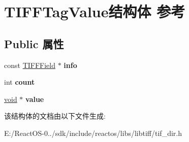\hypertarget{struct_t_i_f_f_tag_value}{}\section{T\+I\+F\+F\+Tag\+Value结构体 参考}
\label{struct_t_i_f_f_tag_value}
\subsection*{Public 属性}
\begin{DoxyCompactItemize}
\item 
\mbox{\label{struct_t_i_f_f_tag_value_a395eac2333247f02552761c84d50030d}} 
const \hyperlink{struct___t_i_f_f_field}{T\+I\+F\+F\+Field} $\ast$ {\bfseries info}
\item 
\mbox{\label{struct_t_i_f_f_tag_value_a309d152f68ea67d12ed0fd6a9667b799}} 
int {\bfseries count}
\item 
\mbox{\label{struct_t_i_f_f_tag_value_a04d8c5b64d026de38175c68c7b5ff02f}} 
\hyperlink{interfacevoid}{void} $\ast$ {\bfseries value}
\end{DoxyCompactItemize}


该结构体的文档由以下文件生成\+:\begin{DoxyCompactItemize}
\item 
E\+:/\+React\+O\+S-\/0../sdk/include/reactos/libs/libtiff/tif\+\_\+dir.\+h\end{DoxyCompactItemize}
